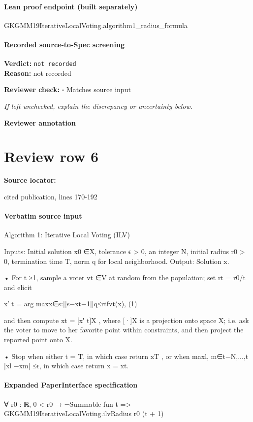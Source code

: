 \documentclass[10pt]{article}
\newcommand{\reviewerbox}{%
  \par\noindent\fbox{\parbox{0.96\linewidth}{\rule{0pt}{0.38in}}}\par
}
\newcommand{\reviewmatch}[1]{%
  \par\noindent\textbf{Reviewer check:} $\square$\; #1\par
  \noindent\emph{If left unchecked, explain the discrepancy or uncertainty below.}\par
}
\begin{document}
\paragraph{Lean proof endpoint (built separately)}\begin{ReviewVerbatim}
GKGMM19IterativeLocalVoting.algorithm1_radius_formula
\end{ReviewVerbatim}

\paragraph{Recorded source-to-Spec screening}
\textbf{Verdict:} \texttt{not recorded}
\\
\textbf{Reason:} not recorded
\reviewmatch{Matches source input}
\noindent\textbf{Reviewer annotation}\par
\reviewerbox
\clearpage
\hypertarget{source-claim-6bcb00a1cec69ec9}{}
\section*{Review row 6}
\textbf{Source locator:} {\footnotesize\raggedright cited publication, lines 170-\allowbreak{}192\par}
\paragraph{Verbatim source input}
\begin{ReviewVerbatim}
Algorithm 1: Iterative Local Voting (ILV)

Inputs:
Initial solution x0 ∈X, tolerance ϵ > 0, an integer N, initial radius r0 > 0,
termination time T, norm q for local neighborhood.
Output:
Solution x.

• For t ≥1, sample a voter vt ∈V at random from the population; set rt = r0/t
and elicit

x′
t = arg maxx∈{s:||s−xt−1||q≤rt}fvt(x),
(1)

and then compute xt = [x′
t]X , where [·]X is a projection onto space X; i.e. ask
the voter to move to her favorite point within constraints, and then project the
reported point onto X.

• Stop when either t = T, in which case return xT , or when
maxl, m∈{t−N,...,t} |xl −xm| ≤ϵ, in which case return x = xt.
\end{ReviewVerbatim}


\paragraph{Expanded PaperInterface specification}
\begin{ReviewVerbatim}
∀ {r0 : ℝ}, 0 < r0 → ¬Summable fun t => GKGMM19IterativeLocalVoting.ilvRadius r0 (t + 1)
\end{ReviewVerbatim}
\end{document}

